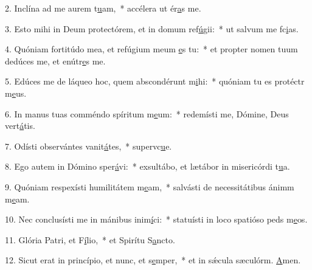 2. Inclína ad me aurem t\uline{u}am,~* accélera ut ér\uline{a}s me.\par 
3. Esto mihi in Deum protectórem, et in domum ref\uline{ú}gii:~* ut salvum me fc\uline{i}as.\par 
4. Quóniam fortitúdo mea, et refúgium meum \uline{e}s tu:~* et propter nomen tuum dedúces me, et enútr\uline{e}s me.\par 
5. Edúces me de láqueo hoc, quem abscondérunt m\uline{i}hi:~* quóniam tu es protéctr m\uline{e}us.\par 
6. In manus tuas comméndo spíritum m\uline{e}um:~* redemísti me, Dómine, Deus vert\uline{á}tis.\par 
7. Odísti observántes vanit\uline{á}tes,~* supervc\uline{u}e.\par 
8. Ego autem in Dómino sper\uline{á}vi:~* exsultábo, et lætábor in misericórdi t\uline{u}a.\par 
9. Quóniam respexísti humilitátem m\uline{e}am,~* salvásti de necessitátibus ánimm m\uline{e}am.\par 
10. Nec conclusísti me in mánibus inim\uline{í}ci:~* statuísti in loco spatióso peds m\uline{e}os.\par 
11. Glória Patri, et F\uline{í}lio,~* et Spirítu S\uline{a}ncto.\par 
12. Sicut erat in princípio, et nunc, et s\uline{e}mper,~* et in sǽcula sæculórm. \uline{A}men.\par 
